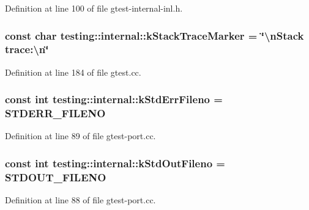 Definition at line 100 of file gtest-\/internal-\/inl.\+h.

\subsubsection[{\texorpdfstring{k\+Stack\+Trace\+Marker}{kStackTraceMarker}}]{\setlength{\rightskip}{0pt plus 5cm}const char testing\+::internal\+::k\+Stack\+Trace\+Marker = \char`\"{}\textbackslash{}n\+Stack trace\+:\textbackslash{}n\char`\"{}}\hypertarget{namespacetesting_1_1internal_abb38528ca6a45df265b19f5ccb3d16d9}{}\label{namespacetesting_1_1internal_abb38528ca6a45df265b19f5ccb3d16d9}


Definition at line 184 of file gtest.\+cc.

\subsubsection[{\texorpdfstring{k\+Std\+Err\+Fileno}{kStdErrFileno}}]{\setlength{\rightskip}{0pt plus 5cm}const int testing\+::internal\+::k\+Std\+Err\+Fileno = S\+T\+D\+E\+R\+R\+\_\+\+F\+I\+L\+E\+NO}\hypertarget{namespacetesting_1_1internal_a747eccfdbdee3ff8af3bedc476a57c85}{}\label{namespacetesting_1_1internal_a747eccfdbdee3ff8af3bedc476a57c85}


Definition at line 89 of file gtest-\/port.\+cc.

\subsubsection[{\texorpdfstring{k\+Std\+Out\+Fileno}{kStdOutFileno}}]{\setlength{\rightskip}{0pt plus 5cm}const int testing\+::internal\+::k\+Std\+Out\+Fileno = S\+T\+D\+O\+U\+T\+\_\+\+F\+I\+L\+E\+NO}\hypertarget{namespacetesting_1_1internal_a24f0a3d50cac54a9132f4828ec9b96d9}{}\label{namespacetesting_1_1internal_a24f0a3d50cac54a9132f4828ec9b96d9}


Definition at line 88 of file gtest-\/port.\+cc.

